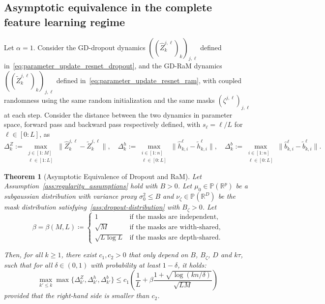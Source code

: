 \documentclass[a4paper,11pt]{article}
\newcommand{\R}{\mathbb{R}}
\newcommand{\1}{\mathbbm{1}}
\renewcommand{\P}{\mathbb{P}}
\newtheorem{theorem}{Theorem}[section]
\theoremstyle{definition}
\theoremstyle{remark}
\begin{document}
\subsection{Asymptotic equivalence in the complete feature learning regime}
Let $\alpha=1$. Consider the GD-dropout dynamics $((\hat{Z}_k^{j,\ell})_k)_{j,\ell}$ defined in~\eqref{eq:parameter_update_resnet_dropout}, and the GD-RaM dynamics $((\tilde{Z}_k^{j,\ell})_k)_{j,\ell}$ defined in~\eqref{eq:parameter_update_resnet_ram}, with coupled randomness using the same random initialization and the same masks $(\zeta^{j,\ell})_{j,\ell}$ at each step.
Consider the distance between the two dynamics in parameter space, forward pass and backward pass respectively defined, with $s_\ell = \ell/L$ for $\ell \in [0:L]$, as
\[
    \Delta_k^Z := \max_{\substack{j \in [1:M] \\ \ell \in [1:L]}} \|\hat{Z}_k^{j,\ell} - \tilde{Z}_k^{j,\ell}\|, \quad
    \Delta_k^h := \max_{\substack{i \in [1:n] \\ \ell \in [0:L]}} \|\hat{h}_{k,i}^\ell - \tilde{h}_{k,i}^\ell\|, \quad
    \Delta_k^b := \max_{\substack{i \in [1:n] \\ \ell \in [0:L]}} \|\hat{b}_{k,i}^\ell - \tilde{b}_{k,i}^\ell\|.
\]
\begin{theorem}[Asymptotic Equivalence of Dropout and RaM]\label{thm:main}
Let Assumption~\ref{ass:regularity_assumptions} hold with $B>0$. Let $\mu_0\in\P(\R^p)$ be a subgaussian distribution with variance proxy $\sigma_0^2 \leq B$ and $\nu_\zeta \in \P(\R^D)$ be the mask distribution satisfying~\eqref{ass:dropout-distribution} with $B_\zeta >0$. Let
\begin{equation}\label{eq:beta}
\beta = \beta(M,L) \coloneqq 
\begin{cases}
1 & \text{if the masks are independent},\\
\sqrt{M} & \text{if the masks are width-shared},\\
\sqrt{L\log L} & \text{if the masks are depth-shared}.
\end{cases}
\end{equation}

Then, for all $k\geq 1$, there exist $c_1, c_2 > 0$ that only depend on $B$, $B_\zeta$, $D$ and $k\tau$, such that for all $\delta\in(0,1)$ with probability at least $1 - \delta$, it holds:
\[
  \max_{k'\leq k} \max \{\Delta_{k'}^Z, \Delta_{k'}^h, \Delta_{k'}^b\}
  \leq c_1 \left(\frac{1}{L}
    +  \beta\frac{1+\sqrt{\log(kn/\delta)}}{\sqrt{LM}}
  \right)
\]
provided that the right-hand side is smaller than $c_2$.
\end{theorem}
\end{document}
